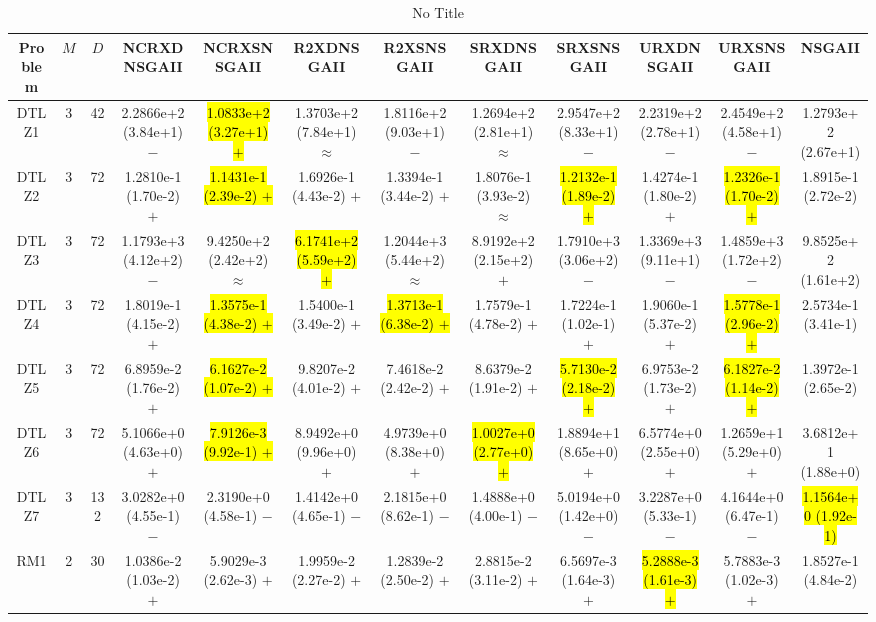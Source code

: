 \documentclass[journal]{IEEEtran}
\begin{document}
\begin{table*}[htbp]
\renewcommand{\arraystretch}{1.2}
\centering
\caption{No Title}
\begin{tabular}{cccccccccccc}
\toprule
Problem&$M$&$D$&NCRXDNSGAII&NCRXSNSGAII&R2XDNSGAII&R2XSNSGAII&SRXDNSGAII&SRXSNSGAII&URXDNSGAII&URXSNSGAII&NSGAII\\
\midrule
\multirow{1}{*}{DTLZ1}&3&42&2.2866e+2 (3.84e+1) $-$&\hl{1.0833e+2 (3.27e+1) $+$}&1.3703e+2 (7.84e+1) $\approx$&1.8116e+2 (9.03e+1) $-$&1.2694e+2 (2.81e+1) $\approx$&2.9547e+2 (8.33e+1) $-$&2.2319e+2 (2.78e+1) $-$&2.4549e+2 (4.58e+1) $-$&1.2793e+2 (2.67e+1)\\
\hline
\multirow{1}{*}{DTLZ2}&3&72&1.2810e-1 (1.70e-2) $+$&\hl{1.1431e-1 (2.39e-2) $+$}&1.6926e-1 (4.43e-2) $+$&1.3394e-1 (3.44e-2) $+$&1.8076e-1 (3.93e-2) $\approx$&\hl{1.2132e-1 (1.89e-2) $+$}&1.4274e-1 (1.80e-2) $+$&\hl{1.2326e-1 (1.70e-2) $+$}&1.8915e-1 (2.72e-2)\\
\hline
\multirow{1}{*}{DTLZ3}&3&72&1.1793e+3 (4.12e+2) $-$&9.4250e+2 (2.42e+2) $\approx$&\hl{6.1741e+2 (5.59e+2) $+$}&1.2044e+3 (5.44e+2) $\approx$&8.9192e+2 (2.15e+2) $+$&1.7910e+3 (3.06e+2) $-$&1.3369e+3 (9.11e+1) $-$&1.4859e+3 (1.72e+2) $-$&9.8525e+2 (1.61e+2)\\
\hline
\multirow{1}{*}{DTLZ4}&3&72&1.8019e-1 (4.15e-2) $+$&\hl{1.3575e-1 (4.38e-2) $+$}&1.5400e-1 (3.49e-2) $+$&\hl{1.3713e-1 (6.38e-2) $+$}&1.7579e-1 (4.78e-2) $+$&1.7224e-1 (1.02e-1) $+$&1.9060e-1 (5.37e-2) $+$&\hl{1.5778e-1 (2.96e-2) $+$}&2.5734e-1 (3.41e-1)\\
\hline
\multirow{1}{*}{DTLZ5}&3&72&6.8959e-2 (1.76e-2) $+$&\hl{6.1627e-2 (1.07e-2) $+$}&9.8207e-2 (4.01e-2) $+$&7.4618e-2 (2.42e-2) $+$&8.6379e-2 (1.91e-2) $+$&\hl{5.7130e-2 (2.18e-2) $+$}&6.9753e-2 (1.73e-2) $+$&\hl{6.1827e-2 (1.14e-2) $+$}&1.3972e-1 (2.65e-2)\\
\hline
\multirow{1}{*}{DTLZ6}&3&72&5.1066e+0 (4.63e+0) $+$&\hl{7.9126e-3 (9.92e-1) $+$}&8.9492e+0 (9.96e+0) $+$&4.9739e+0 (8.38e+0) $+$&\hl{1.0027e+0 (2.77e+0) $+$}&1.8894e+1 (8.65e+0) $+$&6.5774e+0 (2.55e+0) $+$&1.2659e+1 (5.29e+0) $+$&3.6812e+1 (1.88e+0)\\
\hline
\multirow{1}{*}{DTLZ7}&3&132&3.0282e+0 (4.55e-1) $-$&2.3190e+0 (4.58e-1) $-$&1.4142e+0 (4.65e-1) $-$&2.1815e+0 (8.62e-1) $-$&1.4888e+0 (4.00e-1) $-$&5.0194e+0 (1.42e+0) $-$&3.2287e+0 (5.33e-1) $-$&4.1644e+0 (6.47e-1) $-$&\hl{1.1564e+0 (1.92e-1)}\\
\hline
\multirow{1}{*}{RM1}&2&30&1.0386e-2 (1.03e-2) $+$&5.9029e-3 (2.62e-3) $+$&1.9959e-2 (2.27e-2) $+$&1.2839e-2 (2.50e-2) $+$&2.8815e-2 (3.11e-2) $+$&6.5697e-3 (1.64e-3) $+$&\hl{5.2888e-3 (1.61e-3) $+$}&5.7883e-3 (1.02e-3) $+$&1.8527e-1 (4.84e-2)\\

\end{tabular}
\end{table*}
\end{document}
